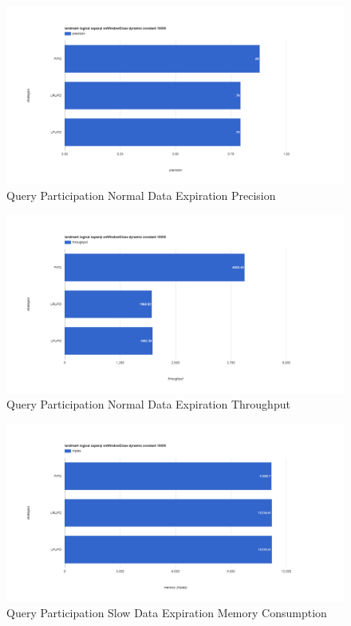 \begin{figure}[!htbp]
	\centering
    \includegraphics[width=6.5in]{img/app3-qp-normal-p.png}
    \caption{Query Participation Normal Data Expiration Precision}
\end{figure}
\begin{figure}[!htbp]
	\centering
    \includegraphics[width=6.5in]{img/app3-qp-normal-t.png}
    \caption{Query Participation Normal Data Expiration Throughput}
\end{figure}
\begin{figure}[!htbp]
	\centering
    \includegraphics[width=6.5in]{img/app3-qp-slow-m.png}
    \caption{Query Participation Slow Data Expiration Memory Consumption}
\end{figure}

